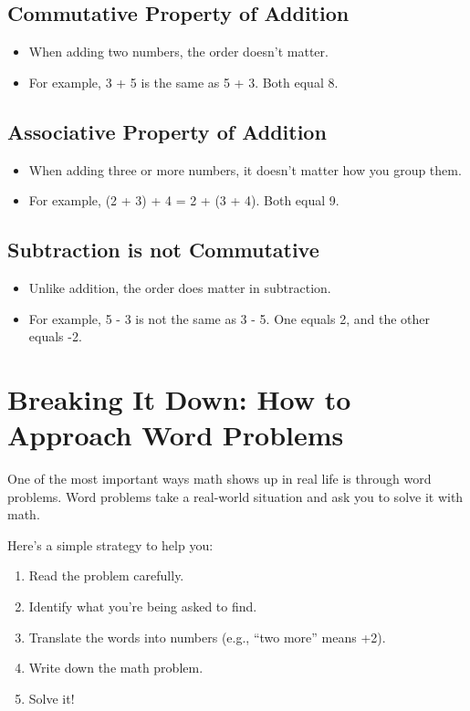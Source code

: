 \subsection{Commutative Property of Addition}
\begin{itemize}
    \item When adding two numbers, the order doesn’t matter.
    \item For example, 3 + 5 is the same as 5 + 3. Both equal 8.
\end{itemize}

\subsection{Associative Property of Addition}
\begin{itemize}
    \item When adding three or more numbers, it doesn’t matter how you group them.
    \item For example, (2 + 3) + 4 = 2 + (3 + 4). Both equal 9.
\end{itemize}

\subsection{Subtraction is not Commutative}
\begin{itemize}
    \item Unlike addition, the order does matter in subtraction.
    \item For example, 5 - 3 is not the same as 3 - 5. One equals 2, and the other equals -2.
\end{itemize}

\section{Breaking It Down: How to Approach Word Problems}
One of the most important ways math shows up in real life is through word problems. Word problems take a real-world situation and ask you to solve it with math.

Here’s a simple strategy to help you:
\begin{enumerate}
    \item Read the problem carefully.
    \item Identify what you’re being asked to find.
    \item Translate the words into numbers (e.g., “two more” means +2).
    \item Write down the math problem.
    \item Solve it!
\end{enumerate}

